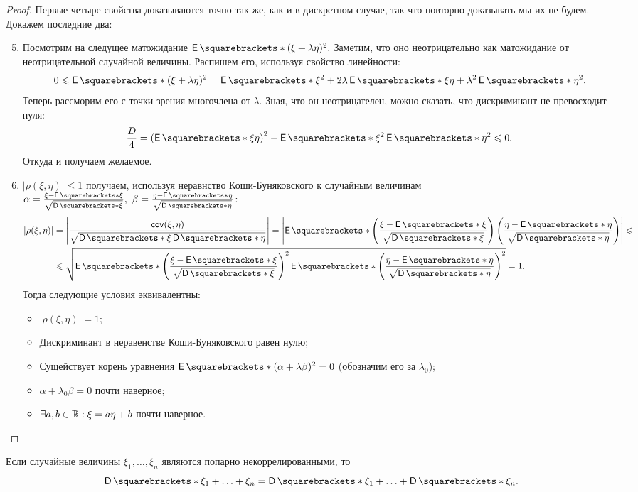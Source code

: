 \begin{proof}
	Первые четыре свойства доказываются точно так же, как и в дискретном случае, так что повторно доказывать мы их не будем. Докажем последние два:
	\begin{enumerate}
		\setcounter{enumi}{4}
		\item Посмотрим на следущее матожидание \(\E{(\xi + \lambda\eta)^2}. \) Заметим, что оно неотрицательно как матожидание от неотрицательной случайной величины. Распишем его, используя свойство линейности: \[0 \leq \E{(\xi + \lambda\eta)^2} = \E{\xi^2} + 2\lambda\E{\xi\eta} + \lambda^2\E{\eta^2}.\] Теперь рассморим его с точки зрения многочлена от \(\lambda\). Зная, что он неотрицателен, можно сказать, что дискриминант не превосходит нуля: \[ \frac{D}{4} = \left(\E{\xi\eta} \right)^2 - \E{\xi^2}\E{\eta^2} \leq 0. \] Откуда и получаем желаемое.
		
		\item \(\left|\rho(\xi, \eta)\right| \leq 1\) получаем, используя неравнство Коши-Буняковского к случайным величинам \(\alpha = \frac{\xi - \E{\xi}}{\sqrt{\D{\xi}}},\ \beta = \frac{\eta - \E{\eta}}{\sqrt{\D{\eta}}}\):
		\begin{align}
			\left|\rho(\xi, \eta)\right| &= \left|\frac{\cov(\xi, \eta)}{\sqrt{\D{\xi}\D{\eta}}}\right| = \left|\E{\left(\frac{\xi - \E{\xi}}{\sqrt{\D{\xi}}}\right)\left(\frac{\eta - \E{\eta}}{\sqrt{\D{\eta}}}\right)}\right| \leq \\
			&\leq \sqrt{\E{\left(\frac{\xi - \E{\xi}}{\sqrt{\D{\xi}}}\right)^2}\E{\left(\frac{\eta - \E{\eta}}{\sqrt{\D{\eta}}}\right)^2}} = 1.
		\end{align}
		Тогда следующие условия эквивалентны:
		\begin{itemize}
			\item \(\left|\rho(\xi, \eta) \right| = 1\);
			\item Дискриминант в неравенстве Коши-Буняковского равен нулю;
			\item Сущействует корень уравнения \(\E{(\alpha + \lambda\beta)^2} = 0\) (обозначим его за \(\lambda_0\));
			\item \(\alpha + \lambda_0\beta = 0\) почти наверное;
			\item \(\exists a,b \in \mathbb{R} : \xi = a\eta + b\) почти наверное. 
		\end{itemize}
	\end{enumerate}
\end{proof}
\begin{consequence}
	Если случайные величины \(\xi_1, \ldots, \xi_n \) являются попарно некоррелированными, то \[\D{\xi_1 + \ldots + \xi_n} = \D{\xi_1} + \ldots + \D{\xi_n}. \]
\end{consequence}

